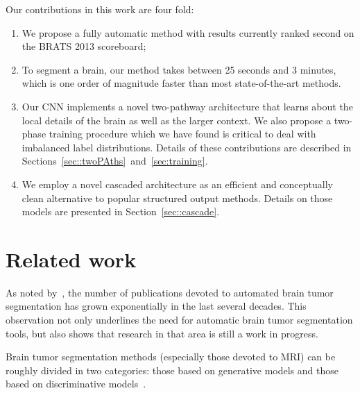 \documentclass[final,5p,times,twocolumn]{elsarticle}
\begin{document}
Our contributions in this work are four fold:
\begin{enumerate}
\item We propose a fully automatic method with results currently ranked second on the BRATS 2013 scoreboard; 
\item To segment a brain, our method takes between 25 seconds and 3 minutes, which is one order of magnitude faster than most state-of-the-art methods. \item Our CNN implements a novel two-pathway architecture that learns about the local details of the brain as well as the larger context.  We also propose a two-phase training procedure which we have found is critical to deal with imbalanced label distributions.  Details of these contributions are described in Sections~\ref{sec::twoPAths}~and~\ref{sec:training}.
\item We employ a novel cascaded architecture as an efficient and conceptually clean alternative to popular structured output methods.
Details on those models are presented in Section~\ref{sec::cascade}.
\end{enumerate}







\section{Related work}
\label{sec:related_work}




As noted by~\citet{Menze2014}, the number of publications devoted to automated brain tumor segmentation has grown exponentially in the last several decades. This observation not only underlines the need for automatic brain tumor segmentation tools, but also shows that research in that area is still a work in progress.

Brain tumor segmentation methods (especially those devoted to MRI) can be roughly divided in two categories: those based on generative models and those based on discriminative models~\citep{Menze2014,Bauer2013,Angelini2007}.
\end{document}
